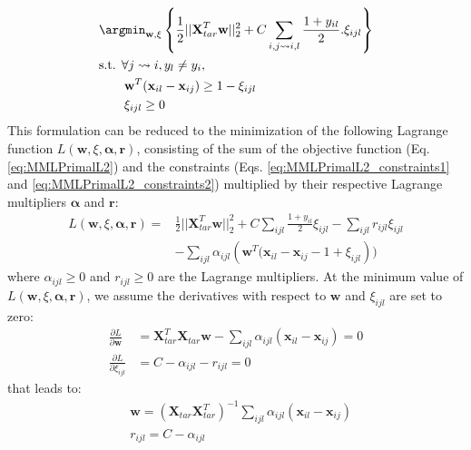 \begin{align}
	&\displaystyle 		\argmin_{\textbf{w},\xi}
	\left\lbrace \frac{1}{2}||\textbf{X}_{tar}^T \textbf{w}||_2^2						
	+					
	C\sum\limits_{i,j \rightsquigarrow i,l} \frac{1+y_{il}}{2}.\xi_{ijl}
	\right\rbrace  \label{eq:MMLPrimalL2} \\
	&\text{s.t.  } \forall j \rightsquigarrow i, y_l\neq y_i, \nonumber \\
	& \qquad \textbf{w}^T(\textbf{x}_{il}-\textbf{x}_{ij}) \geq 1-\xi_{ijl} \label{eq:MMLPrimalL2_constraints1} \\
	& \qquad \xi_{ijl} \geq 0 \label{eq:MMLPrimalL2_constraints2}
\end{align}
This formulation can be reduced to the minimization of the following Lagrange function $L(\textbf{w},\xi,\boldsymbol{\alpha},\textbf{r})$, consisting of the sum of the objective function (Eq. \ref{eq:MMLPrimalL2}) and the constraints (Eqs. \ref{eq:MMLPrimalL2_constraints1} and \ref{eq:MMLPrimalL2_constraints2}) multiplied by their respective Lagrange multipliers $\boldsymbol{\alpha}$ and $\textbf{r}$:
\begin{equation}
\begin{aligned}
	L(\textbf{w},\xi,\boldsymbol{\alpha},\textbf{r}) 
	= & 
	\frac{1}{2}||\textbf{X}_{tar}^T \textbf{w}||_2^2
	+ C \sum\limits_{ijl} \frac{1+y_{il}}{2} \xi_{ijl} - \sum\limits_{ijl}r_{ijl} \xi_{ijl} \\
	&  - \sum\limits_{ijl} \alpha_{ijl}\left( \textbf{w}^T(\textbf{x}_{il}-\textbf{x}_{ij}-1+\xi_{ijl} \right))
	\label{eq:OptimizationDual}
\end{aligned}
\end{equation}
\noindent where $\alpha_{ijl} \geq 0$ and $r_{ijl} \geq 0$ are the Lagrange multipliers. At the minimum value of $L(\textbf{w},\xi,\boldsymbol{\alpha},\textbf{r})$, we assume the derivatives with respect to $\textbf{w}$ and $\xi_{ijl}$ are set to zero:
\begin{align*}
\frac{\partial L}{\partial \textbf{w}} 
& = 
\textbf{X}_{tar}^T \textbf{X}_{tar} \textbf{w} 
- \sum\limits_{ijl} \alpha_{ijl}(\textbf{x}_{il}-\textbf{x}_{ij}) 
= 0 \\
\frac{\partial L}{\partial \xi_{ijl}} & = C - \alpha_{ijl} - r_{ijl} = 0
\end{align*}
\noindent that leads to:
\begin{align}
& \textbf{w} = (\textbf{X}_{tar} \textbf{X}_{tar}^T)^{-1}  
\sum\limits_{ijl} \alpha_{ijl}(\textbf{x}_{il}-\textbf{x}_{ij}) \label{Eq:eqn_w} 
\\ 
& r_{ijl} = C - \alpha_{ijl} \label{Eq:eqn_w2}
\end{align}

